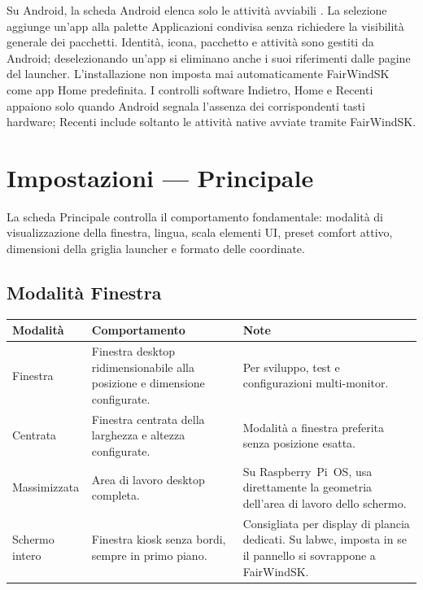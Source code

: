 Su Android, la scheda Android elenca solo le attività avviabili
. La selezione aggiunge un'app alla palette Applicazioni
condivisa senza richiedere la visibilità generale dei pacchetti. Identità, icona,
pacchetto e attività sono gestiti da Android; deselezionando un'app si eliminano
anche i suoi riferimenti dalle pagine del launcher. L'installazione non imposta mai
automaticamente FairWindSK come app Home predefinita. I controlli software Indietro,
Home e Recenti appaiono solo quando Android segnala l'assenza dei corrispondenti tasti
hardware; Recenti include soltanto le attività native avviate tramite FairWindSK.

\chapter{Impostazioni --- Principale}
\label{ch:impostazioni-principale}

La scheda Principale controlla il comportamento fondamentale: modalità di visualizzazione
della finestra, lingua, scala elementi UI, preset comfort attivo, dimensioni della griglia
launcher e formato delle coordinate.


\section{Modalità Finestra}

\begin{longtable}{L{2.4cm}L{5.6cm}L{5.7cm}}
\toprule
{}
\color{white}\sffamily\bfseries Modalità &
\color{white}\sffamily\bfseries Comportamento &
\color{white}\sffamily\bfseries Note \\
\midrule
Finestra      & Finestra desktop ridimensionabile alla posizione e dimensione configurate. &
  Per sviluppo, test e configurazioni multi-monitor. \\
Centrata      & Finestra centrata della larghezza e altezza configurate. &
  Modalità a finestra preferita senza posizione esatta. \\
Massimizzata  & Area di lavoro desktop completa. &
  Su Raspberry~Pi~OS, usa direttamente la geometria dell'area di lavoro dello schermo. \\
Schermo intero & Finestra kiosk senza bordi, sempre in primo piano. &
  Consigliata per display di plancia dedicati.
  Su labwc, imposta  in  se il pannello
  si sovrappone a FairWindSK. \\
\bottomrule
\end{longtable}

